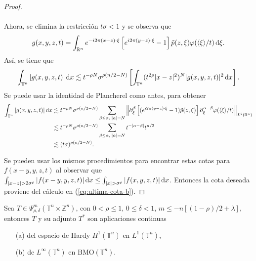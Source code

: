\begin{proof}
\begin{itemize}
\begin{align*}
		\end{align*}
		Ahora, se elimina la restricción $t\sigma<1$ y se observa que
		\begin{equation*}
			g(x, y, z, t) = \int_{\mathbb{R}^n} e^{-i2\pi (x-z) \cdot \xi} \left[ e^{i2\pi (y-z) \cdot \xi} -1 \right]\tilde{p}(z, \xi)\varphi(\langle\xi\rangle/t) \mathop{}\!\mathrm{d} \xi.
		\end{equation*}
		Así, se tiene que
		\begin{equation*}
			\int_{\mathbb{T}^n} |g(x, y, z, t)|\mathop{}\!\mathrm{d} x \lesssim t^{-\rho N}\sigma^{\rho(n/2 - N)} \left[ \int_{\mathbb{T}^n} (t^{2\rho}|x-z|^2)^N|g(x, y, z, t)|^2\mathop{}\!\mathrm{d} x \right].
		\end{equation*}
		Se puede usar la identidad de Plancherel como antes, para obtener
		\begin{align*}
			\int_{\mathbb{T}^n} |g(x, y, z, t)|\mathop{}\!\mathrm{d} x  & \lesssim t^{-\rho N}\sigma^{\rho(n/2 - N)} \sum_{\beta\leq\alpha,\;|\alpha|=N} \left\| \partial^\beta_\xi \left[ (e^{i2\pi (y-z) \cdot \xi} -1)\tilde{p}(z, \xi) \right] \partial^{\alpha-\beta}_\xi\varphi(\langle\xi\rangle/t) \right\|_{L^2(\mathbb{R}^n)} \\
			&\lesssim t^{-\rho N}\sigma^{\rho(n/2 - N)} \sum_{\beta\leq\alpha,\;|\alpha|=N}t^{-|\alpha-\beta|}t^{n/2} \\
			 & \lesssim (t\sigma)^{\rho(n/2-N)}.
		\end{align*}
	\end{itemize}
	Se pueden usar los mismos procedimientos para encontrar estas cotas para $f(x-y, y,z, t)$ al observar que $\int_{|x-z|>2\sigma^\rho} |f(x-y, y,z, t)|\diff x \leq \int_{|x|>\sigma^\rho} |f(x, y,z, t)|\diff x$. Entonces la cota deseada proviene del cálculo en (\ref{eq:ultima-cota-b}).
\end{proof}
\begin{theorem}\label{theo:L1-H1-L-infty-BMO}
	Sea $T \in \Psi^m_{\rho, \delta}(\mathbb{T}^n \times \mathbb{Z}^n) $, con $0 < \rho \leq 1$, $0 \leq \delta < 1$, $m \leq - n [(1-\rho)/2 + \lambda] $, entonces $T$ y su adjunto $T^*$ son aplicaciones continuas
	\begin{itemize}
		\item[(a)] del espacio de Hardy $H^1(\mathbb{T}^n)$ en $L^1(\mathbb{T}^n)$,
		\item[(b)] de $L^\infty(\mathbb{T}^n)$ en $\text{BMO}(\mathbb{T}^n)$.
	\end{itemize}
\end{theorem}
